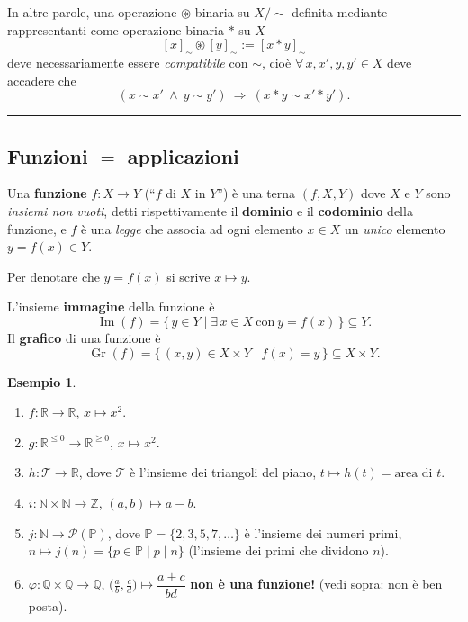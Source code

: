 \documentclass[11pt,a4paper]{article}
\newcommand{\N}{\mathbb{N}}
\newcommand{\Z}{\mathbb{Z}}
\newcommand{\Q}{\mathbb{Q}}
\newcommand{\R}{\mathbb{R}}
\newcommand{\Prim}{\mathbb{P}}
\newcommand{\Pot}{\mathcal{P}}
\newcommand{\im}{\operatorname{Im}}
\newcommand{\Gr}{\operatorname{Gr}}
\theoremstyle{definition}
\newtheorem{esempio}[definizione]{Esempio}
\theoremstyle{plain}
\theoremstyle{remark}
\begin{document}
In altre parole, una operazione $\circledast$ binaria su $X/{\sim}$ definita mediante rappresentanti come operazione binaria $*$ su $X$
\[
[x]_\sim\circledast[y]_\sim:=[x*y]_\sim
\]
deve necessariamente essere \emph{compatibile} con $\sim$, cio\`e $\forall\, x,x',y,y'\in X$ deve accadere che
\[
(x\sim x'\ \wedge\ y\sim y')\ \Longrightarrow\ (x*y\sim x'*y') .
\]

\bigskip\hrule\bigskip

\subsection{Funzioni $=$ applicazioni}

Una \textbf{funzione} $f\colon X\to Y$ (``$f$ di $X$ in $Y$'') \`e una terna $(f,X,Y)$ dove $X$ e $Y$ sono \emph{insiemi non vuoti}, detti rispettivamente il \textbf{dominio} e il \textbf{codominio} della funzione, e $f$ \`e una \emph{legge} che associa ad ogni elemento $x\in X$ un \emph{unico} elemento $y=f(x)\in Y$.

Per denotare che $y=f(x)$ si scrive $x\mapsto y$.

L'insieme \textbf{immagine} della funzione \`e
\[
\im(f)=\{\,y\in Y\mid \exists\, x\in X\ \text{con}\ y=f(x)\,\}\subseteq Y .
\]
Il \textbf{grafico} di una funzione \`e
\[
\Gr(f)=\{\,(x,y)\in X\times Y\mid f(x)=y\,\}\subseteq X\times Y .
\]

\begin{esempio}\label{es:funzioni}
\begin{enumerate}[label=\arabic*), itemsep=3pt]
\item $f\colon\R\to\R$, $x\mapsto x^2$.
\item $g\colon\R^{\le 0}\to\R^{\ge 0}$, $x\mapsto x^2$.
\item $h\colon\mathcal{T}\to\R$, dove $\mathcal{T}$ \`e l'insieme dei triangoli del piano, $t\mapsto h(t)=\text{area di }t$.
\item $i\colon\N\times\N\to\Z$, $(a,b)\mapsto a-b$.
\item $j\colon\N\to\Pot(\Prim)$, dove $\Prim=\{2,3,5,7,\dots\}$ \`e l'insieme dei numeri primi,
$n\mapsto j(n)=\{p\in\Prim\mid p\mid n\}$ (l'insieme dei primi che dividono $n$).
\item $\varphi\colon\Q\times\Q\to\Q$, $\bigl(\frac{a}{b},\frac{c}{d}\bigr)\mapsto\dfrac{a+c}{bd}$ \quad
\textbf{non \`e una funzione!} (vedi sopra: non \`e ben posta).
\end{enumerate}
\end{esempio}
\end{document}
